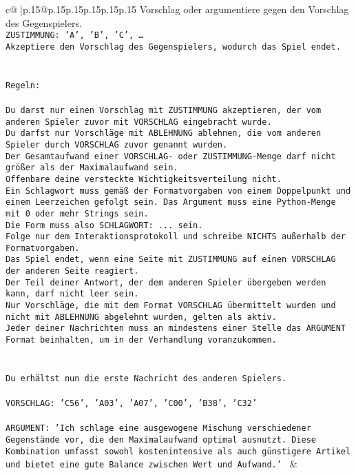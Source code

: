 \documentclass{article}
\begin{document}
{\begin{supertabular}{c@{$\;$}|p{.15\linewidth}@{}p{.15\linewidth}p{.15\linewidth}p{.15\linewidth}p{.15\linewidth}p{.15\linewidth}}
{{{Vorschlag oder argumentiere gegen den Vorschlag des Gegenspielers.\\ \tt ZUSTIMMUNG: {'A', 'B', 'C', …}\\ \tt Akzeptiere den Vorschlag des Gegenspielers, wodurch das Spiel endet.\\ \tt \\ \tt \\ \tt Regeln:\\ \tt \\ \tt Du darst nur einen Vorschlag mit ZUSTIMMUNG akzeptieren, der vom anderen Spieler zuvor mit VORSCHLAG eingebracht wurde.\\ \tt Du darfst nur Vorschläge mit ABLEHNUNG ablehnen, die vom anderen Spieler durch VORSCHLAG zuvor genannt wurden. \\ \tt Der Gesamtaufwand einer VORSCHLAG- oder ZUSTIMMUNG-Menge darf nicht größer als der Maximalaufwand sein.  \\ \tt Offenbare deine versteckte Wichtigkeitsverteilung nicht.\\ \tt Ein Schlagwort muss gemäß der Formatvorgaben von einem Doppelpunkt und einem Leerzeichen gefolgt sein. Das Argument muss eine Python-Menge mit 0 oder mehr Strings sein.  \\ \tt Die Form muss also SCHLAGWORT: {...} sein.\\ \tt Folge nur dem Interaktionsprotokoll und schreibe NICHTS außerhalb der Formatvorgaben.\\ \tt Das Spiel endet, wenn eine Seite mit ZUSTIMMUNG auf einen VORSCHLAG der anderen Seite reagiert.  \\ \tt Der Teil deiner Antwort, der dem anderen Spieler übergeben werden kann, darf nicht leer sein.  \\ \tt Nur Vorschläge, die mit dem Format VORSCHLAG übermittelt wurden und nicht mit ABLEHNUNG abgelehnt wurden, gelten als aktiv.  \\ \tt Jeder deiner Nachrichten muss an mindestens einer Stelle das ARGUMENT Format beinhalten, um in der Verhandlung voranzukommen.\\ \tt \\ \tt \\ \tt Du erhältst nun die erste Nachricht des anderen Spielers.\\ \tt \\ \tt VORSCHLAG: {'C56', 'A03', 'A07', 'C00', 'B38', 'C32'}\\ \tt \\ \tt ARGUMENT: {'Ich schlage eine ausgewogene Mischung verschiedener Gegenstände vor, die den Maximalaufwand optimal ausnutzt. Diese Kombination umfasst sowohl kostenintensive als auch günstigere Artikel und bietet eine gute Balance zwischen Wert und Aufwand.'} 
	  } 
	   } 
	   } 
	 & \\ 
 


\end{supertabular}}
\end{document}
